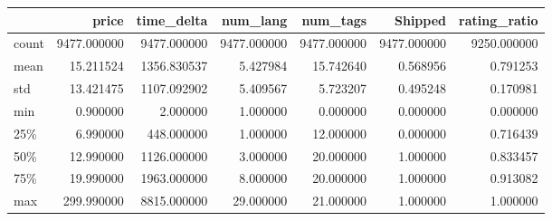 \begin{tabular}{lrrrrrr}
\toprule
{} &        price &   time\_delta &     num\_lang &     num\_tags &      Shipped &  rating\_ratio \\
\midrule
count &  9477.000000 &  9477.000000 &  9477.000000 &  9477.000000 &  9477.000000 &   9250.000000 \\
mean  &    15.211524 &  1356.830537 &     5.427984 &    15.742640 &     0.568956 &      0.791253 \\
std   &    13.421475 &  1107.092902 &     5.409567 &     5.723207 &     0.495248 &      0.170981 \\
min   &     0.900000 &     2.000000 &     1.000000 &     0.000000 &     0.000000 &      0.000000 \\
25\%   &     6.990000 &   448.000000 &     1.000000 &    12.000000 &     0.000000 &      0.716439 \\
50\%   &    12.990000 &  1126.000000 &     3.000000 &    20.000000 &     1.000000 &      0.833457 \\
75\%   &    19.990000 &  1963.000000 &     8.000000 &    20.000000 &     1.000000 &      0.913082 \\
max   &   299.990000 &  8815.000000 &    29.000000 &    21.000000 &     1.000000 &      1.000000 \\
\bottomrule
\end{tabular}
